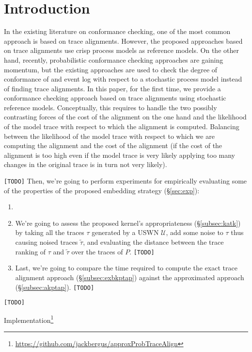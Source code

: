 \section{Introduction}\label{introduction}


In the existing literature on conformance checking, one of the most common approach is based on trace alignments. However, the proposed approaches based on trace alignments use crisp process models as reference models. On the other hand, recently, probabilistic conformance checking approaches are gaining momentum, but the existing approaches are used to check the degree of conformance of and event log with respect to a stochastic process model instead of finding trace alignments.
In this paper, for the first time, we provide a conformance checking approach based on trace alignments using stochastic reference models. Conceptually, this requires to handle the two possibly contrasting forces of the cost of the alignment on the one hand and the likelihood of the model trace with respect to which the alignment is computed.
Balancing between the likelihood of the model trace with respect to which we are computing the alignment and the cost of the alignment (if the cost of the alignment is too high even if the model trace is very likely applying too many changes in the original trace is in turn not very likely).




\texttt{\color{red}[TODO]}
Then, we're going to perform experiments for empirically evaluating some of the properties of the proposed embedding strategy (\S\ref{sec:exp}):
\begin{enumerate}
	\item {}
	\item We're going to assess the proposed kernel's appropriateness (\S\ref{subsec:katk}) by taking all the traces $\tau$ generated by a USWN $\mathcal{U}$, add some noise to $\tau$ thus causing noised traces $\tilde{\tau}$, and evaluating the distance between the trace ranking of $\tau$ and $\tilde{\tau}$ over the traces of $P$. \texttt{\color{red}[TODO]}
	\item Last, we're going to compare the time required to compute the exact trace alignment approach (\S\ref{subsec:exbkptap}) against the approximated approach (\S\ref{subsec:akptap}). \texttt{\color{red}[TODO]}
\end{enumerate}
\texttt{\color{red}[TODO]}

Implementation\footnote{\url{https://github.com/jackbergus/approxProbTraceAlign}}